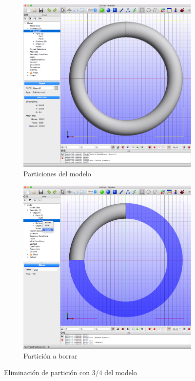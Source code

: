 \begin{figure}[!htp]
\centering
\begin{subfigure}[b]{0.48\textwidth}
\centering
\includegraphics[width=\linewidth]{figuras_4/03_Model-partitions.png}
\caption{Particiones del modelo}
\label{fig:03_Model-partitions}
\end{subfigure}
\begin{subfigure}[b]{0.48\textwidth}
\includegraphics[width=\linewidth]{figuras_4/03b_Model-partition-delete.png}
\caption{Partición a borrar}
\label{fig:03b_Model-partition-delete}
\end{subfigure}
\caption{Eliminación de partición con 3/4 del modelo}
\label{fig:03bc}
\end{figure}

